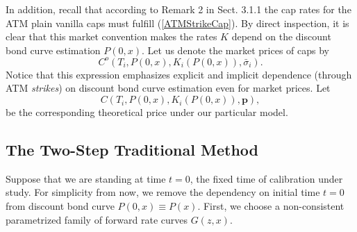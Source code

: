 In addition, recall that according to Remark 2 in Sect. 3.1.1 the cap  
 rates for the ATM plain vanilla caps must fulfill
 (\ref{ATMStrikeCap}). %
By direct inspection, it is clear that this market convention makes
the rates $K$ depend on the discount bond curve estimation
$P(0,x)$. Let us denote the market prices of caps by 
$$C^o\left(T_i,P(0,x),K_i(P(0,x)),\bar\sigma_i\right).$$ Notice that this expression
emphasizes explicit and implicit dependence  (through ATM {\sl
  strikes}) on discount bond curve estimation even for market
prices. Let $$C\left(T_i,P(0,x),K_i(P(0,x)),\boldsymbol p\right),$$ be the
corresponding theoretical price under our particular model.

\subsection{The Two-Step Traditional Method}
Suppose that we are standing at time $t=0$, the fixed time of
calibration under study. For simplicity from now, we remove the
dependency on initial time $t=0$ from discount bond curve
$P(0,x)\equiv P(x)$. First, we choose a non-consistent parametrized
family of forward rate curves $G(z,x)$. 

